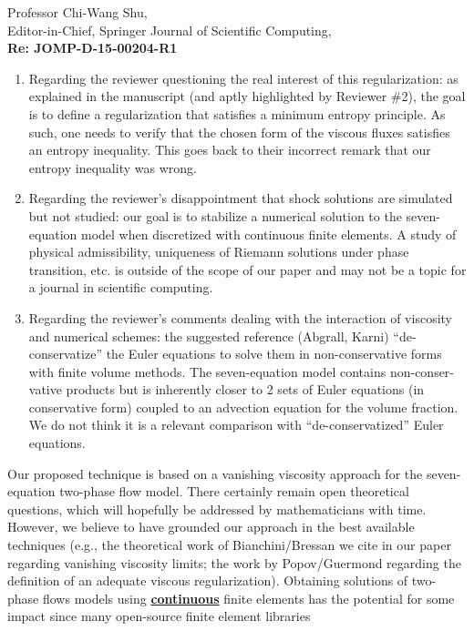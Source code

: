 \documentclass[11pt]{letter}
\begin{document}
\begin{letter}{Professor Chi-Wang Shu, \\  Editor-in-Chief, Springer Journal of Scientific Computing,\\
\textbf{Re: JOMP-D-15-00204-R1}}
\begin{itemize}
\begin{enumerate}
(e.g., M. L. Wilkins, ``Use of artificial viscosity in multi-dimensional fluid dynamic calculations,'' JCP, {\bf 36}, 281--303, 1980).\\
\item Regarding the reviewer questioning the real interest of this regularization: as explained 
in the manuscript (and aptly highlighted by Reviewer \#2),  the goal is to define a regularization 
that satisfies a minimum entropy principle. As such, one needs to verify that the chosen form of the viscous fluxes satisfies an entropy inequality. This goes back to their incorrect remark that our entropy inequality was wrong. 
\item Regarding the reviewer's disappointment that shock solutions are simulated but not studied: our goal is to stabilize a numerical solution to the seven-equation model when discretized with continuous finite elements. A study of physical admissibility, uniqueness of Riemann solutions under phase transition, etc. is outside of the scope of our paper and may not be a topic for a journal in scientific computing. 
\item Regarding the reviewer's comments dealing with the interaction of viscosity and numerical schemes: the suggested reference (Abgrall, Karni) ``de-conservatize'' the Euler equations to solve them in non-conservative forms with finite volume methods. The seven-equation model contains non-conser-vative products but is inherently closer to 2 sets of Euler equations (in conservative form) coupled to an advection equation for the volume fraction. We do not think it is a relevant comparison with ``de-conservatized'' Euler equations. 
\end{enumerate} 
\end{itemize}
%
Our proposed technique 
is based on a vanishing viscosity approach for the seven-equation two-phase flow model. 
There certainly remain open theoretical questions, which will hopefully be addressed by mathematicians with time. However, we believe to have grounded our approach in the best available techniques (e.g., the theoretical 
work of Bianchini/Bressan we cite in our paper regarding vanishing viscosity limits; the work by Popov/Guermond
regarding the definition of an adequate viscous regularization). Obtaining solutions of two-phase flows models using {\bf \underline{continuous} } finite elements has the potential for some impact since many open-source finite element libraries

\end{letter}
\end{document}
